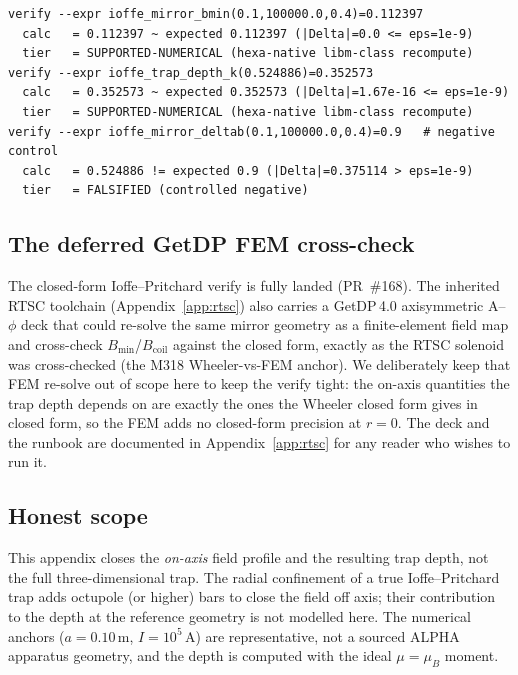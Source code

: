 \begin{lstlisting}
verify --expr ioffe_mirror_bmin(0.1,100000.0,0.4)=0.112397
  calc   = 0.112397 ~ expected 0.112397 (|Delta|=0.0 <= eps=1e-9)
  tier   = SUPPORTED-NUMERICAL (hexa-native libm-class recompute)
verify --expr ioffe_trap_depth_k(0.524886)=0.352573
  calc   = 0.352573 ~ expected 0.352573 (|Delta|=1.67e-16 <= eps=1e-9)
  tier   = SUPPORTED-NUMERICAL (hexa-native libm-class recompute)
verify --expr ioffe_mirror_deltab(0.1,100000.0,0.4)=0.9   # negative control
  calc   = 0.524886 != expected 0.9 (|Delta|=0.375114 > eps=1e-9)
  tier   = FALSIFIED (controlled negative)
\end{lstlisting}

\subsection{The deferred GetDP FEM cross-check}
\label{app:conf-fem}

The closed-form Ioffe--Pritchard verify is fully landed (PR~\#168). The
inherited RTSC toolchain (Appendix~\ref{app:rtsc}) also carries a GetDP\,4.0
axisymmetric A--$\phi$ deck that could re-solve the same mirror geometry as a
finite-element field map and cross-check $B_{\min}$/$B_{\mathrm{coil}}$ against
the closed form, exactly as the RTSC solenoid was cross-checked (the M318
Wheeler-vs-FEM anchor). We deliberately keep that FEM re-solve out of scope
here to keep the verify tight: the on-axis quantities the trap depth depends
on are exactly the ones the Wheeler closed form gives in closed form, so the
FEM adds no closed-form precision at $r=0$. The deck and the runbook are
documented in Appendix~\ref{app:rtsc} for any reader who wishes to run it.

\subsection{Honest scope}
\label{app:conf-scope}

This appendix closes the \emph{on-axis} field profile and the resulting trap
depth, not the full three-dimensional trap. The radial confinement of a true
Ioffe--Pritchard trap adds octupole (or higher) bars to close the field off
axis; their contribution to the depth at the reference geometry is not modelled
here. The numerical anchors ($a=0.10$\,m, $I=10^5$\,A) are representative, not
a sourced ALPHA apparatus geometry, and the depth is computed with the
ideal $\mu=\mu_B$ moment.
